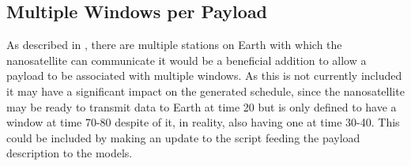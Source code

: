 \subsection*{Multiple Windows per Payload}\label{ssec:multi_window}
As described in , there are multiple stations on Earth with which the nanosatellite can communicate it would be a beneficial addition to allow a payload to be associated with multiple windows. As this is not currently included it may have a significant impact on the generated schedule, since the nanosatellite may be ready to transmit data to Earth at time 20 but is only defined to have a window at time 70-80 despite of it, in reality, also having one at time 30-40. This could be included by making an update to the script feeding the payload description to the models.

